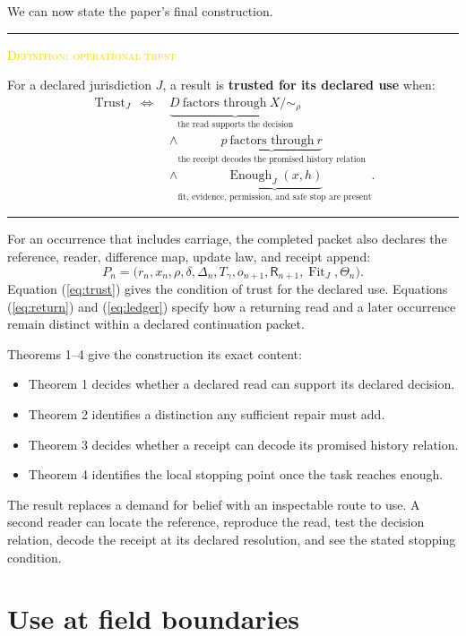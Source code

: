 \documentclass[11pt]{article}
\newcommand{\smallcaps}[1]{{\footnotesize\textsc{#1}}}
\newcommand{\eqrefn}[1]{(\ref{#1})}
\newenvironment{claimbox}[1]{%
  \par\vspace{0.55em}\noindent\begin{minipage}{\linewidth}
  \color{line}\rule{\linewidth}{0.55pt}\par\vspace{0.34em}%
  \textcolor{gold}{\smallcaps{#1}}\par\vspace{0.3em}\color{ink}%
}{%
  \par\vspace{0.38em}\color{line}\rule{\linewidth}{0.55pt}%
  \end{minipage}\par\vspace{0.55em}%
}
\begin{document}
We can now state the paper's final construction.

\begin{claimbox}{Definition: operational trust}
For a declared jurisdiction $J$, a result is \textbf{trusted for its declared use} when:
\[
\boxed{
\begin{aligned}
\operatorname{Trust}_J\ \Longleftrightarrow\ &
\underbrace{D\ \text{factors through}\ X/{\sim_\rho}}_{\text{the read supports the decision}}\\
&\land\underbrace{p\ \text{factors through}\ r}_{\text{the receipt decodes the promised history relation}}\\
&\land\underbrace{\operatorname{Enough}_J(x,h)}_{\text{fit, evidence, permission, and safe stop are present}}.
\end{aligned}}
\tag{23}\label{eq:trust}
\]
\end{claimbox}

For an occurrence that includes carriage, the completed packet also declares the reference, reader, difference map, update law, and receipt append:
\[
P_n=\bigl(r_n,x_n,\rho,\delta,\Delta_n,T_\gamma,o_{n+1},\mathsf R_{n+1},\operatorname{Fit}_J,\Theta_n\bigr).
\tag{24}\label{eq:packet}
\]
Equation \eqrefn{eq:trust} gives the condition of trust for the declared use. Equations \eqrefn{eq:return} and \eqrefn{eq:ledger} specify how a returning read and a later occurrence remain distinct within a declared continuation packet.

Theorems 1--4 give the construction its exact content:
\begin{itemize}
  \item Theorem 1 decides whether a declared read can support its declared decision.
  \item Theorem 2 identifies a distinction any sufficient repair must add.
  \item Theorem 3 decides whether a receipt can decode its promised history relation.
  \item Theorem 4 identifies the local stopping point once the task reaches enough.
\end{itemize}

The result replaces a demand for belief with an inspectable route to use. A second reader can locate the reference, reproduce the read, test the decision relation, decode the receipt at its declared resolution, and see the stated stopping condition.

\section{Use at field boundaries}
\end{document}
